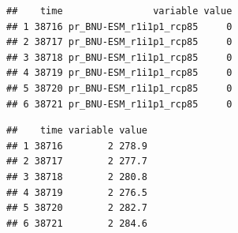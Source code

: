 \documentclass[
  paper=a4,
  ,captions=tableheading
]{scrartcl}
\newenvironment{Shaded}{\begin{snugshade}}{\end{snugshade}}
\newcommand{\AttributeTok}[1]{\textcolor[rgb]{0.77,0.63,0.00}{#1}}
\newcommand{\DecValTok}[1]{\textcolor[rgb]{0.00,0.00,0.81}{#1}}
\newcommand{\FunctionTok}[1]{\textcolor[rgb]{0.00,0.00,0.00}{#1}}
\newcommand{\NormalTok}[1]{#1}
\newcommand{\OtherTok}[1]{\textcolor[rgb]{0.56,0.35,0.01}{#1}}
\newcommand{\SpecialCharTok}[1]{\textcolor[rgb]{0.00,0.00,0.00}{#1}}
\newcommand{\StringTok}[1]{\textcolor[rgb]{0.31,0.60,0.02}{#1}}
\begin{document}
\begin{verbatim}
##    time                variable value
## 1 38716 pr_BNU-ESM_r1i1p1_rcp85     0
## 2 38717 pr_BNU-ESM_r1i1p1_rcp85     0
## 3 38718 pr_BNU-ESM_r1i1p1_rcp85     0
## 4 38719 pr_BNU-ESM_r1i1p1_rcp85     0
## 5 38720 pr_BNU-ESM_r1i1p1_rcp85     0
## 6 38721 pr_BNU-ESM_r1i1p1_rcp85     0
\end{verbatim}

\begin{Shaded}
\end{Shaded}

\begin{verbatim}
##    time variable value
## 1 38716        2 278.9
## 2 38717        2 277.7
## 3 38718        2 280.8
## 4 38719        2 276.5
## 5 38720        2 282.7
## 6 38721        2 284.6
\end{verbatim}
\end{document}
